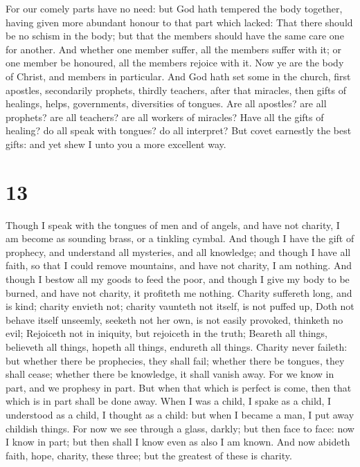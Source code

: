  For our comely parts have no need: but God hath tempered
the body together, having given more abundant honour to that part which
lacked:  That there should be no schism in the body; but
that the members should have the same care one for another.
 And whether one member suffer, all the members suffer
with it; or one member be honoured, all the members rejoice with it.
 Now ye are the body of Christ, and members in
particular.  And God hath set some in the church, first
apostles, secondarily prophets, thirdly teachers, after that miracles,
then gifts of healings, helps, governments, diversities of tongues.
 Are all apostles? are all prophets? are all teachers?
are all workers of miracles?  Have all the gifts of
healing? do all speak with tongues? do all interpret? 
But covet earnestly the best gifts: and yet shew I unto you a more
excellent way.

\hypertarget{section-12}{%
\section{13}\label{section-12}}

 Though I speak with the tongues of men and of angels, and
have not charity, I am become as sounding brass, or a tinkling cymbal.
 And though I have the gift of prophecy, and understand
all mysteries, and all knowledge; and though I have all faith, so that I
could remove mountains, and have not charity, I am nothing.
 And though I bestow all my goods to feed the poor, and
though I give my body to be burned, and have not charity, it profiteth
me nothing.  Charity suffereth long, and is kind; charity
envieth not; charity vaunteth not itself, is not puffed up,
 Doth not behave itself unseemly, seeketh not her own, is
not easily provoked, thinketh no evil;  Rejoiceth not in
iniquity, but rejoiceth in the truth;  Beareth all things,
believeth all things, hopeth all things, endureth all things.
 Charity never faileth: but whether there be prophecies,
they shall fail; whether there be tongues, they shall cease; whether
there be knowledge, it shall vanish away.  For we know in
part, and we prophesy in part.  But when that which is
perfect is come, then that which is in part shall be done away.
 When I was a child, I spake as a child, I understood as
a child, I thought as a child: but when I became a man, I put away
childish things.  For now we see through a glass, darkly;
but then face to face: now I know in part; but then shall I know even as
also I am known.  And now abideth faith, hope, charity,
these three; but the greatest of these is charity.


